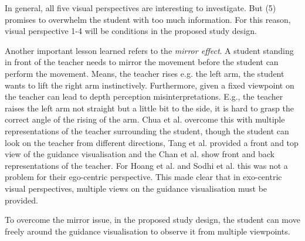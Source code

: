 \begin{tcolorbox}[colback=red!30!white]
In general, all five visual perspectives are interesting to investigate. But (5) promises to overwhelm the student with too much information. For this reason, visual perspective 1-4 will be conditions in the proposed study design.
\end{tcolorbox}
Another important lesson learned refers to the \textit{mirror effect}. A student standing in front of the teacher needs to mirror the movement before the student can perform the movement. Means, the teacher rises e.g. the left arm, the student wants to lift the right arm instinctively. Furthermore, given a fixed viewpoint on the teacher can lead to depth perception misinterpretations. E.g., the teacher raises the left arm not straight but a little bit to the side, it is hard to grasp the correct angle of the rising of the arm. Chua et al. overcome this with multiple representations of the teacher surrounding the student, though the student can look on the teacher from different directions, Tang et al. provided a front and top view of the guidance visualisation and the Chan et al. show front and back representations of the teacher. For Hoang et al. and Sodhi et al. this was not a problem for their ego-centric perspective. This made clear that in exo-centric visual perspectives, multiple views on the guidance visualisation must be provided.
\begin{tcolorbox}[colback=red!30!white]
To overcome the mirror issue, in the proposed study design, the student can move freely around the guidance visualisation to observe it from multiple viewpoints.
\end{tcolorbox}
